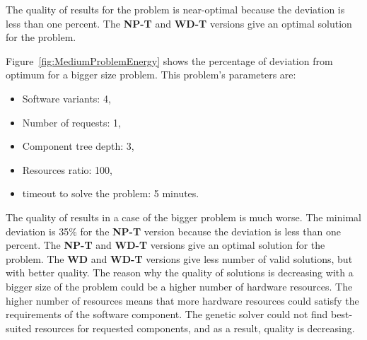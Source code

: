 The quality of results for the problem is near-optimal because the deviation is less than one percent. The \textbf{NP-T} and \textbf{WD-T} versions give an optimal solution for the problem.

Figure~\ref{fig:MediumProblemEnergy} shows the percentage of deviation from optimum for a bigger size problem. This problem's parameters are:
\begin{itemize}
	\item Software variants: 4,
	\item Number of requests: 1,
	\item Component tree depth: 3,
	\item Resources ratio: 100,
	\item timeout to solve the problem: 5 minutes.
\end{itemize}


The quality of results in a case of the bigger problem is much worse. The minimal deviation is 35\% for the \textbf{NP-T} version because the deviation is less than one percent. The \textbf{NP-T} and \textbf{WD-T} versions give an optimal solution for the problem. The \textbf{WD} and \textbf{WD-T} versions give less number of valid solutions, but with better quality. The reason why the quality of solutions is decreasing with a bigger size of the problem could be a higher number of hardware resources. The higher number of resources means that more hardware resources could satisfy the requirements of the software component. The genetic solver could not find best-suited resources for requested components, and as a result, quality is decreasing. 


